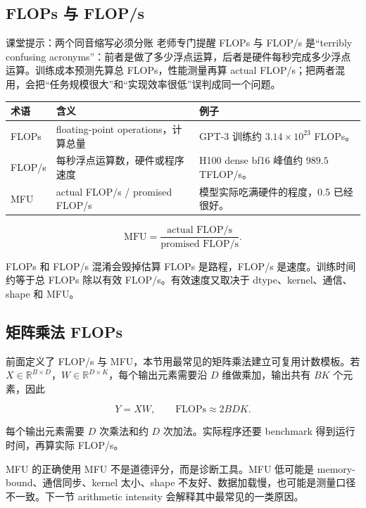 \documentclass[a4paper]{article}
\begin{document}
\subsection{FLOPs 与 FLOP/s}

\begin{knowledgebox}{课堂提示：两个同音缩写必须分账}
老师专门提醒 FLOPs 与 FLOP/s 是“terribly confusing acronyms”：前者是做了多少浮点运算，后者是硬件每秒完成多少浮点运算。训练成本预测先算总 FLOPs，性能测量再算 actual FLOP/s；把两者混用，会把“任务规模很大”和“实现效率很低”误判成同一个问题。
\end{knowledgebox}

\begin{longtable}{p{}p{}p{}}
\toprule
\textbf{术语} & \textbf{含义} & \textbf{例子} \\
\midrule
FLOPs & floating-point operations，计算总量 & GPT-3 训练约 \(3.14\times 10^{23}\) FLOPs。 \\
FLOP/s & 每秒浮点运算数，硬件或程序速度 & H100 dense bf16 峰值约 \(989.5\) TFLOP/s。 \\
MFU & actual FLOP/s / promised FLOP/s & 模型实际吃满硬件的程度，0.5 已经很好。 \\
\bottomrule
\end{longtable}

\[
\mathrm{MFU}=\frac{\text{actual FLOP/s}}{\text{promised FLOP/s}}.
\]

\begin{warningbox}{FLOPs 和 FLOP/s 混淆会毁掉估算}
FLOPs 是路程，FLOP/s 是速度。训练时间约等于总 FLOPs 除以有效 FLOP/s。有效速度又取决于 dtype、kernel、通信、shape 和 MFU。
\end{warningbox}

\subsection{矩阵乘法 FLOPs}

前面定义了 FLOP/s 与 MFU，本节用最常见的矩阵乘法建立可复用计数模板。若 \(X\in\mathbb{R}^{B\times D}\)，\(W\in\mathbb{R}^{D\times K}\)，每个输出元素需要沿 $D$ 维做乘加，输出共有 $BK$ 个元素，因此

\[
Y=XW,\qquad
\text{FLOPs}\approx 2BDK.
\]

每个输出元素需要 \(D\) 次乘法和约 \(D\) 次加法。实际程序还要 benchmark 得到运行时间，再算实际 FLOP/s。

\begin{importantbox}{MFU 的正确使用}
MFU 不是道德评分，而是诊断工具。MFU 低可能是 memory-bound、通信同步、kernel 太小、shape 不友好、数据加载慢，也可能是测量口径不一致。下一节 arithmetic intensity 会解释其中最常见的一类原因。
\end{importantbox}
\end{document}
